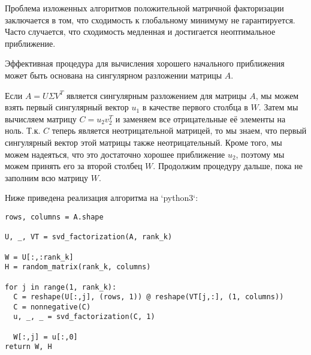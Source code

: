 Проблема изложенных алгоритмов положительной матричной факторизации заключается в том, что сходимость к глобальному минимуму не гарантируется. Часто случается, что сходимость медленная и достигается неоптимальное приближение.

Эффективная процедура для вычисления хорошего начального приближения может быть основана на сингулярном разложении матрицы $A$.

Если $A = U \Sigma V^T $ является сингулярным разложением для матрицы $A$, мы можем взять первый сингулярный вектор $u_1$ в качестве первого столбца в $W$. Затем мы вычисляем матрицу $C = u_2 v_2^T$ и заменяем все отрицательные её элементы на ноль. Т.к. $C$ теперь является неотрицательной матрицей, то мы знаем, что первый сингулярный вектор этой матрицы также неотрицательный. Кроме того, мы можем надеяться, что это достаточно хорошее приближение $u_2$, поэтому мы можем принять его за второй столбец $W$. Продолжим процедуру дальше, пока не заполним всю матрицу $W$.

Ниже приведена реализация алгоритма на `python3`:

\verbatimfont{\small}
\begin{verbatim}
rows, columns = A.shape

U, _, VT = svd_factorization(A, rank_k)

W = U[:,:rank_k]
H = random_matrix(rank_k, columns)

for j in range(1, rank_k):
  C = reshape(U[:,j], (rows, 1)) @ reshape(VT[j,:], (1, columns))
  C = nonnegative(C)
  u, _, _ = svd_factorization(C, 1)

  W[:,j] = u[:,0]
return W, H
\end{verbatim}

